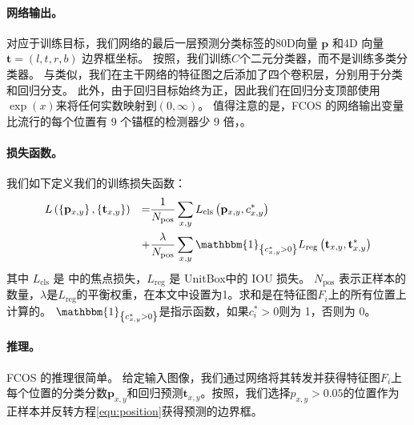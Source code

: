 \documentclass[../main.tex]{subfile}
\begin{document}
\paragraph{网络输出。}

对应于训练目标，我们网络的最后一层预测分类标签的80D向量 $\mathbf{p}$ 和4D 向量 $\mathbf{t} = \left(l, t, r, b\right)$ 边界框坐标。 按照\cite{retinanet}，我们训练$ C $个二元分类器，而不是训练多类分类器。 与\cite{retinanet}类似，我们在主干网络的特征图之后添加了四个卷积层，分别用于分类和回归分支。 此外，由于回归目标始终为正，因此我们在回归分支顶部使用$ \exp\left(x\right) $来将任何实数映射到$\left(0, \infty \right)$。 值得注意的是，FCOS 的网络输出变量比流行的每个位置有 9 个锚框的检测器\cite{retinanet, fasterrcnn}少 9 倍，。

\paragraph{损失函数。}

我们如下定义我们的训练损失函数：
\begin{equation}
    \begin{aligned}
         & L\left(\left\{\mathbf{p}_{x,y}\right\},\left\{\mathbf{t}_{x,y}\right\}\right) & = & \frac{1}{N_\text{pos}}\sum_{x,y}L_\text{cls}\left( \mathbf{p}_{x,y}, c_{x,y}^\ast \right)                                                               \\
         &                                                                               & + & \frac{\lambda}{N_\text{pos}} \sum_{x, y}\mathbbm{1}_{\left\{c_{x,y}^\ast > 0\right\}}L_\text{reg}\left( \mathbf{t}_{x,y}, \mathbf{t}_{x,y}^\ast \right)
    \end{aligned}
\end{equation}
其中 $L_\text{cls}$ 是 \cite{retinanet}中的焦点损失，$L_\text{reg}$ 是 UnitBox\cite{unitbox}中的 IOU 损失。 $N_\text{pos}$ 表示正样本的数量，$\lambda$是$L_\text{reg} $的平衡权重，在本文中设置为1。求和是在特征图$ F_i $上的所有位置上计算的。 $\mathbbm{1}_{\left\{c_{x,y}^\ast > 0\right\}}$是指示函数，如果$ c^\ast_i > 0 $则为 1，否则为 0。

\paragraph{推理。}

FCOS 的推理很简单。 给定输入图像，我们通过网络将其转发并获得特征图$ F_i $上每个位置的分类分数$\mathbf{p}_{x,y}$和回归预测$\mathbf{t}_{x,y}$。按照\cite{retinanet}，我们选择$p_{x,y} > 0.05 $的位置作为正样本并反转方程\ref{equ:position}获得预测的边界框。
\end{document}
